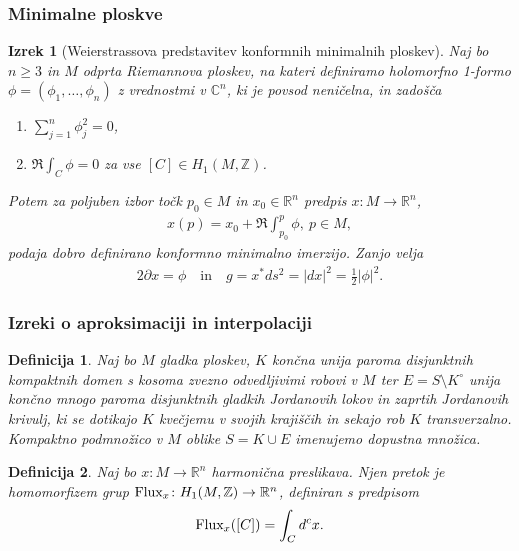 \documentclass[9pt, table]{beamer}
\newtheorem{izrek}{Izrek}
\newtheorem{definicija}{Definicija}
\newcommand{\R}{\mathbb R}
\newcommand{\Z}{\mathbb Z}
\newcommand{\C}{\mathbb C}
\begin{document}

\begin{frame}
\frametitle{Minimalne ploskve}

\begin{izrek}[Weierstrassova predstavitev konformnih minimalnih ploskev]
Naj bo $n \geq 3$ in $M$ odprta Riemannova ploskev, na kateri definiramo holomorfno 1-formo $\phi = (\phi_{1}, \dots , \phi_{n})$ z vrednostmi v $\C^{n}$, ki je povsod neničelna, in zadošča 
\begin{enumerate}
\item $ \sum_{j=1}^{n} \phi_{j}^{2} = 0$,
\item $ \Re \int_{C} \phi = 0 $ za vse $[C] \in H_{1} (M, \Z)$.
\end{enumerate}
Potem za poljuben izbor točk $p_0 \in M$ in $x_0 \in \R^{n}$ predpis $x \colon M \to \R^{n}$,
\begin{align} \label{eq:Wstrass-kmi}
x(p) = x_0 + \Re \int_{p_0}^{p} \phi, \ p \in M,
\end{align}
podaja dobro definirano konformno minimalno imerzijo. Zanjo velja
\begin{align}
2 \partial{x} = \phi \quad \text{in} \quad g = x^{*} ds^2 = |dx|^2 = \frac{1}{2} |\phi|^2.
\end{align}
\end{izrek}

\end{frame}


\begin{frame}
\frametitle{Izreki o aproksimaciji in interpolaciji}

\begin{definicija}
Naj bo $M$ gladka ploskev, $K$ končna unija paroma disjunktnih kompaktnih domen s kosoma zvezno odvedljivimi robovi v $M$ ter $E = S \setminus K^\circ$ unija končno mnogo paroma disjunktnih gladkih Jordanovih lokov in zaprtih Jordanovih krivulj, ki se dotikajo $K$ kvečjemu v svojih krajiščih in sekajo rob $K$ transverzalno. Kompaktno podmnožico v $M$ oblike $S = K \cup E$ imenujemo \textup{dopustna množica}.
\end{definicija}

\pause
\begin{definicija}
Naj bo $x \colon M \to \R^{n}$ harmonična preslikava. Njen \textup{pretok} je homomorfizem grup $\textup{Flux}_{x} \colon H_{1} (M, \Z) \to \R^{n}$, definiran s predpisom 
\begin{equation}
\textup{Flux}_{x} ([C]) = \int_{C} {d^{c} x}.
\end{equation}
\end{definicija}

\end{frame}
\end{document}
